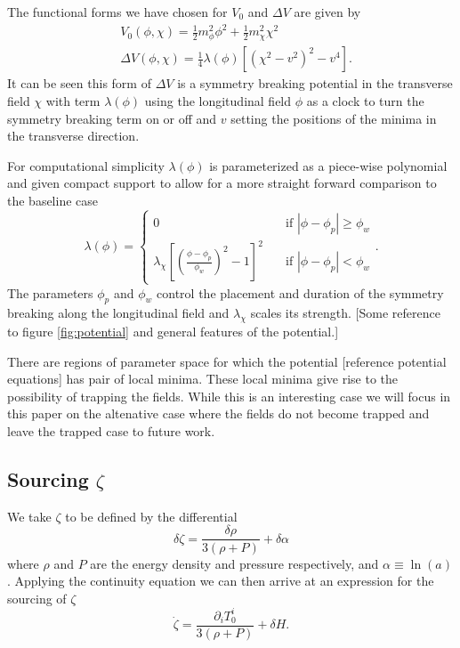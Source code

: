The functional forms we have chosen for $V_0$ and $\Delta V$ are given by
\begin{align} \label{eq:potential}
  &V_0(\phi,\chi) = \frac{1}{2}m^2_\phi\phi^2 + \frac{1}{2}m^2_\chi\chi^2 \\
  &\Delta V(\phi,\chi) = \frac{1}{4}\lambda(\phi)\left[ (\chi^2-v^2)^2 - v^4 \right]. \label{eq:potential feature}
\end{align} 
It can be seen this form of $\Delta V$ is a symmetry breaking potential in the transverse field $\chi$ with term $\lambda(\phi)$ using the longitudinal field $\phi$ as a clock to turn the symmetry breaking term on or off and $v$ setting the positions of the minima in the transverse direction.

For computational simplicity $\lambda(\phi)$ is parameterized as a piece-wise polynomial and given compact support to allow for a more straight forward comparison to the baseline case
\begin{equation} \label{eq:lambda}
  \lambda(\phi) =
  \begin{cases}
    0 & \quad \text{if } |\phi-\phi_p|\ge\phi_w \\
    \lambda_\chi\left[\left(\frac{\phi-\phi_p}{\phi_w}\right)^2 - 1 \right]^2 & \quad \text{if  } |\phi-\phi_p|<\phi_w
  \end{cases}.
\end{equation}
The parameters $\phi_p$ and $\phi_w$ control the placement and duration of the symmetry breaking along the longitudinal field and $\lambda_\chi$ scales its strength.
[Some reference to figure \ref{fig:potential} and general features of the potential.]

There are regions of parameter space for which the potential [reference potential equations] has pair of local minima. These local minima give rise to the possibility of trapping the fields. While this is an interesting case we will focus in this paper on the altenative case where the fields do not become trapped and leave the trapped case to future work. 

\subsection{Sourcing $\zeta$}

We take $\zeta$ to be defined by the differential
\begin{equation} \label{eq:zeta differential}
  \delta\zeta = \frac{\delta\rho}{3(\rho + P)} + \delta\alpha
\end{equation} 
where $\rho$ and $P$ are the energy density and pressure respectively, and $\alpha \equiv \ln(a)$.
Applying the continuity equation we can then arrive at an expression for the sourcing of $\zeta$
\begin{equation} \label{eq:zeta source T}
  \dot{\zeta} = \frac{\partial_iT^i_0}{3(\rho+P)} + \delta H. %
\end{equation} 

